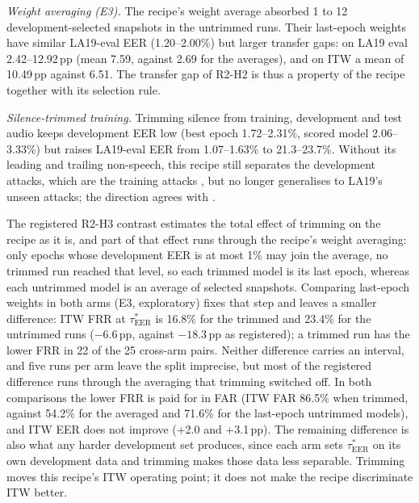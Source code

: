 \documentclass[review,authoryear]{elsarticle}
\newcommand{\tauE}{\tau^{*}_{\mathrm{EER}}}
\begin{document}
\emph{Weight averaging (E3).} The recipe's weight average absorbed 1 to 12 development-selected snapshots in the
untrimmed runs. Their last-epoch weights have similar LA19-eval EER (1.20--2.00\%) but larger transfer gaps: on LA19 eval
2.42--12.92\,pp (mean 7.59, against 2.69 for the averages), and on ITW a mean of 10.49\,pp against 6.51. The transfer gap
of R2-H2 is thus a property of the recipe together with its selection rule.

\emph{Silence-trimmed training.} Trimming silence from training, development and test audio keeps development EER low
(best epoch 1.72--2.31\%, scored model 2.06--3.33\%) but raises LA19-eval EER from 1.07--1.63\% to 21.3--23.7\%.
Without its leading and trailing non-speech, this recipe still separates the development attacks, which are the
training attacks \citep{wang20_asvspoof2019}, but no longer generalises to LA19's unseen attacks; the direction agrees
with \citet{muller21_silence}.

The registered R2-H3 contrast estimates the total effect of trimming on the recipe as it is, and part of that effect
runs through the recipe's weight averaging: only epochs whose development EER is at most 1\% may join the average, no
trimmed run reached that level, so each trimmed model is its last epoch, whereas each untrimmed model is an average of
selected snapshots. Comparing last-epoch weights in both arms (E3, exploratory) fixes that step and leaves a smaller
difference: ITW FRR at \(\tauE\) is 16.8\% for the trimmed and 23.4\% for the untrimmed runs (\(-6.6\)\,pp, against
\(-18.3\)\,pp as registered); a trimmed run has the lower FRR in 22 of the 25 cross-arm pairs. Neither difference carries
an interval, and five runs per arm leave the split imprecise, but most of the registered difference runs through the
averaging that trimming switched off. In both comparisons the lower FRR is paid for in FAR (ITW FAR 86.5\% when trimmed,
against 54.2\% for the averaged and 71.6\% for the last-epoch untrimmed models), and ITW EER does not improve (+2.0 and
+3.1\,pp). The remaining difference is also what any harder development set produces, since each arm sets \(\tauE\) on its
own development data and trimming makes those data less separable. Trimming moves this recipe's ITW operating point; it
does not make the recipe discriminate ITW better.
\end{document}
